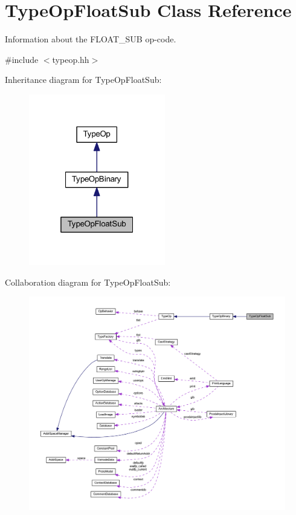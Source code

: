 \hypertarget{class_type_op_float_sub}{}\section{Type\+Op\+Float\+Sub Class Reference}
\label{class_type_op_float_sub}


Information about the F\+L\+O\+A\+T\+\_\+\+S\+UB op-\/code.  




{\ttfamily \#include $<$typeop.\+hh$>$}



Inheritance diagram for Type\+Op\+Float\+Sub\+:
\nopagebreak
\begin{figure}[H]
\begin{center}
\leavevmode
\includegraphics[width=169pt]{class_type_op_float_sub__inherit__graph}
\end{center}
\end{figure}


Collaboration diagram for Type\+Op\+Float\+Sub\+:
\nopagebreak
\begin{figure}[H]
\begin{center}
\leavevmode
\includegraphics[width=350pt]{class_type_op_float_sub__coll__graph}
\end{center}
\end{figure}
